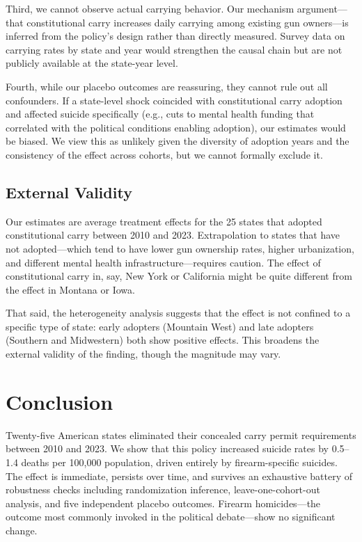\documentclass[12pt]{article}
\begin{document}
Third, we cannot observe actual carrying behavior. Our mechanism argument---that constitutional carry increases daily carrying among existing gun owners---is inferred from the policy's design rather than directly measured. Survey data on carrying rates by state and year would strengthen the causal chain but are not publicly available at the state-year level.

Fourth, while our placebo outcomes are reassuring, they cannot rule out all confounders. If a state-level shock coincided with constitutional carry adoption and affected suicide specifically (e.g., cuts to mental health funding that correlated with the political conditions enabling adoption), our estimates would be biased. We view this as unlikely given the diversity of adoption years and the consistency of the effect across cohorts, but we cannot formally exclude it.

\subsection{External Validity}

Our estimates are average treatment effects for the 25 states that adopted constitutional carry between 2010 and 2023. Extrapolation to states that have not adopted---which tend to have lower gun ownership rates, higher urbanization, and different mental health infrastructure---requires caution. The effect of constitutional carry in, say, New York or California might be quite different from the effect in Montana or Iowa.

That said, the heterogeneity analysis suggests that the effect is not confined to a specific type of state: early adopters (Mountain West) and late adopters (Southern and Midwestern) both show positive effects. This broadens the external validity of the finding, though the magnitude may vary.

\section{Conclusion}\label{sec:conclusion}

Twenty-five American states eliminated their concealed carry permit requirements between 2010 and 2023. We show that this policy increased suicide rates by 0.5--1.4 deaths per 100,000 population, driven entirely by firearm-specific suicides. The effect is immediate, persists over time, and survives an exhaustive battery of robustness checks including randomization inference, leave-one-cohort-out analysis, and five independent placebo outcomes. Firearm homicides---the outcome most commonly invoked in the political debate---show no significant change.
\end{document}
